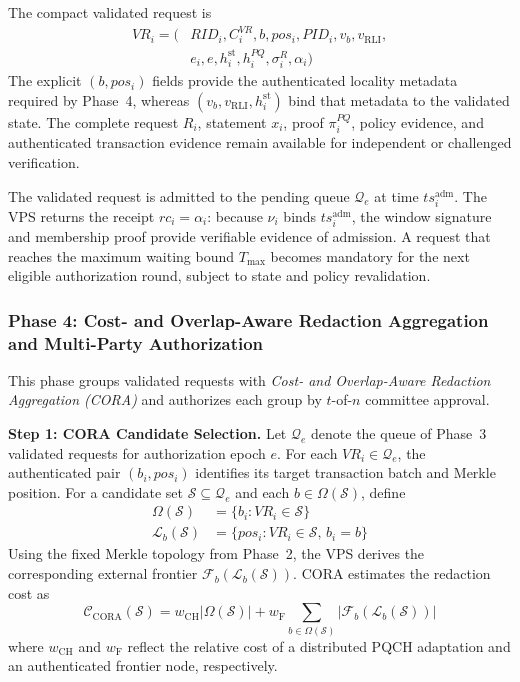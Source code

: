 \documentclass[lettersize,journal]{IEEEtran}
\begin{document}
The compact validated request is
\begin{equation}
\begin{aligned}
VR_i=\big(&RID_i,C_i^{VR},b,pos_i,PID_i,
v_b,v_{\mathrm{RLI}},\\
&e_i,e,h_i^{\mathrm{st}},h_i^{PQ},
\sigma_i^R,\alpha_i\big)
\end{aligned}
\end{equation}
The explicit $(b,pos_i)$ fields provide the authenticated locality
metadata required by Phase~4, whereas
$(v_b,v_{\mathrm{RLI}},h_i^{\mathrm{st}})$ bind that metadata to the
validated state. The complete request $R_i$, statement $x_i$, proof
$\pi_i^{PQ}$, policy evidence, and authenticated transaction evidence
remain available for independent or challenged verification.

The validated request is admitted to the pending queue
$\mathcal{Q}_e$ at time $ts_i^{\mathrm{adm}}$. The VPS returns
the receipt $rc_i=\alpha_i$: because $\nu_i$ binds
$ts_i^{\mathrm{adm}}$, the window signature and membership proof
provide verifiable evidence of admission. A request that reaches
the maximum waiting bound $T_{\max}$ becomes mandatory for the next
eligible authorization round, subject to state and policy revalidation.    
    
  \subsubsection*{\textbf{Phase 4: Cost- and Overlap-Aware Redaction
Aggregation and Multi-Party Authorization}}

This phase groups validated requests with \emph{Cost- and Overlap-Aware
Redaction Aggregation (CORA)} and authorizes each group by $t$-of-$n$
committee approval.

\medskip
\noindent\textbf{Step 1: CORA Candidate Selection.}
Let $\mathcal{Q}_e$ denote the queue of Phase~3 validated requests for
authorization epoch $e$. For each $VR_i\in\mathcal{Q}_e$, the authenticated
pair $(b_i,pos_i)$ identifies its target transaction batch and Merkle
position. For a candidate set $\mathcal{S}\subseteq\mathcal{Q}_e$ and
each $b\in\Omega(\mathcal{S})$, define
\begin{equation}
\begin{aligned}
\Omega(\mathcal{S})&=\{b_i:VR_i\in\mathcal{S}\}\\
\mathcal{L}_b(\mathcal{S})&=\{pos_i:VR_i\in\mathcal{S},\,b_i=b\}
\end{aligned}
\end{equation}
Using the fixed Merkle topology from Phase~2, the VPS derives the
corresponding external frontier
$\mathcal{F}_b(\mathcal{L}_b(\mathcal{S}))$. CORA estimates the
redaction cost as
\begin{equation}
\mathcal{C}_{\mathrm{CORA}}(\mathcal{S})
=
w_{\mathrm{CH}}|\Omega(\mathcal{S})|
+
w_{\mathrm{F}}
\sum_{b\in\Omega(\mathcal{S})}
|\mathcal{F}_b(\mathcal{L}_b(\mathcal{S}))|
\end{equation}
where $w_{\mathrm{CH}}$ and $w_{\mathrm{F}}$ reflect the relative cost
of a distributed PQCH adaptation and an authenticated frontier node,
respectively.
\end{document}
